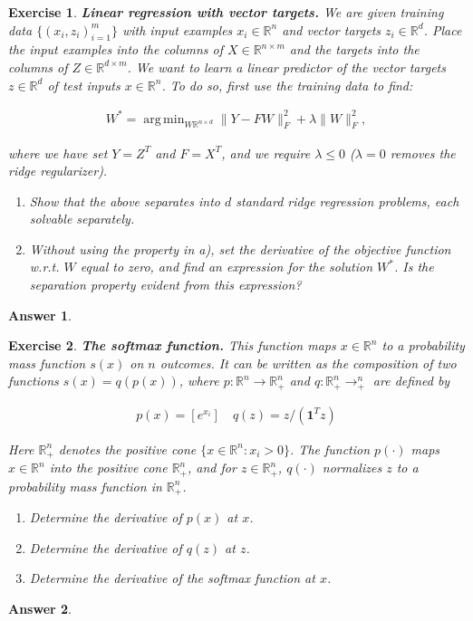 \documentclass[12pt]{article}
\DeclareMathOperator*{\argmin}{arg\,min}
\theoremstyle{colon}
\newtheorem{exercise}{Exercise}
\newtheorem*{answer}{Answer}
\begin{document}
\begin{exercise}
  \textbf{Linear regression with vector targets.} We are given training data $\{ (x_i, z_i)_{i=1}^m \}$ with input examples $x_i \in \mathbb{R}^n$ and vector targets $z_i \in \mathbb{R}^d$. Place the input examples into the columns of $X \in \mathbb{R}^{n \times m}$ and the targets into the columns of $Z \in \mathbb{R}^{d \times m}$. We want to learn a linear predictor of the vector targets $z \in \mathbb{R}^d$ of test inputs $x \in \mathbb{R}^n$. To do so, first use the training data to find:

  \begin{gather*}
    W^* = \argmin_{W \mathbb{R}^{n \times d}} \lVert Y - FW \rVert_F^2 + \lambda \lVert W \rVert_F^2,
  \end{gather*}

  where we have set $Y = Z^T$ and $F = X^T$, and we require $\lambda \leq 0$ ($\lambda = 0$ removes the ridge regularizer).

  \begin{enumerate}[label=\alph*)]
    \item Show that the above separates into $d$ standard ridge regression problems, each solvable separately.
    \item Without using the property in a), set the derivative of the objective function w.r.t. $W$ equal to zero, and find an expression for the solution $W^*$. Is the separation property evident from this expression?
  \end{enumerate}
\end{exercise}

\begin{answer}
  
\end{answer}

\clearpage

\begin{exercise}
  \textbf{The softmax function.} This function maps $x \in \mathbb{R}^n$ to a probability mass function $s(x)$ on $n$ outcomes. It can be written as the composition of two functions $s(x) = q(p(x))$, where $p: \mathbb{R}^n \rightarrow \mathbb{R}_+^n$ and $q: \mathbb{R}_+^n \rightarrow_+^n$ are defined by

  \begin{gather*}
    p(x) = [e^{x_i}] \quad q(z) = z/(\bm{1}^T z)
  \end{gather*}

  Here $\mathbb{R}_+^n$ denotes the positive cone $\{ x \in \mathbb{R}^n: x_i > 0 \}$. The function $p(\cdot)$ maps $x \in \mathbb{R}^n$ into the positive cone $\mathbb{R}_+^n$, and for $z \in \mathbb{R}_+^n$, $q(\cdot)$ normalizes $z$ to a probability mass function in $\mathbb{R}_+^n$.

  \begin{enumerate}[label=\alph*)]
    \item Determine the derivative of $p(x)$ at $x$.
    \item Determine the derivative of $q(z)$ at $z$.
    \item Determine the derivative of the softmax function at $x$.
  \end{enumerate}
\end{exercise}

\begin{answer}
  
\end{answer}
\end{document}
